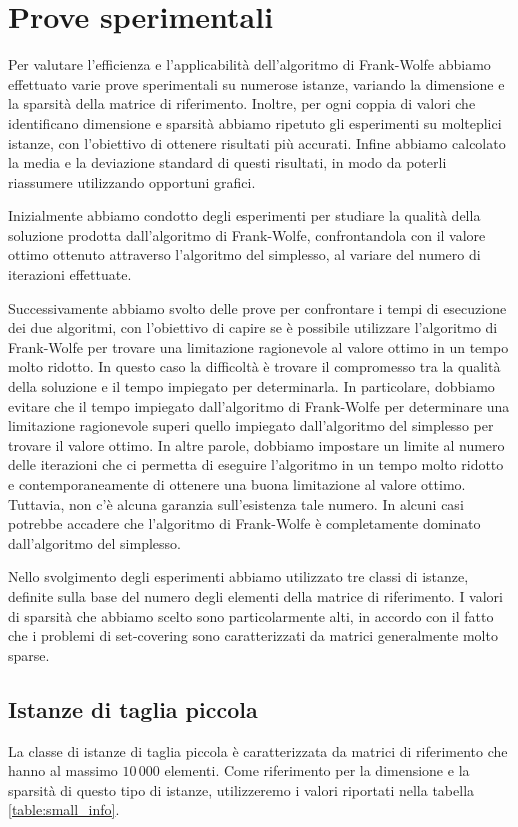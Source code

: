\section{Prove sperimentali}
Per valutare l'efficienza e l'applicabilità dell'algoritmo di Frank-Wolfe abbiamo effettuato varie prove sperimentali su
numerose istanze, variando la dimensione e la sparsità della matrice di riferimento. Inoltre, per ogni coppia di valori
che identificano dimensione e sparsità abbiamo ripetuto gli esperimenti su molteplici istanze, con l'obiettivo di
ottenere risultati più accurati. Infine abbiamo calcolato la media e la deviazione standard di questi risultati, in modo
da poterli riassumere utilizzando opportuni grafici.

Inizialmente abbiamo condotto degli esperimenti per studiare la qualità della soluzione prodotta dall'algoritmo di
Frank-Wolfe, confrontandola con il valore ottimo ottenuto attraverso l'algoritmo del simplesso, al variare del numero di
iterazioni effettuate.

Successivamente abbiamo svolto delle prove per confrontare i tempi di esecuzione dei due algoritmi, con l'obiettivo di
capire se è possibile utilizzare l'algoritmo di Frank-Wolfe per trovare una limitazione ragionevole al valore ottimo in
un tempo molto ridotto. In questo caso la difficoltà è trovare il compromesso tra la qualità della soluzione e il tempo
impiegato per determinarla. In particolare, dobbiamo evitare che il tempo impiegato dall'algoritmo di Frank-Wolfe per
determinare una limitazione ragionevole superi quello impiegato dall'algoritmo del simplesso per trovare il valore
ottimo. In altre parole, dobbiamo impostare un limite al numero delle iterazioni che ci permetta di eseguire l'algoritmo
in un tempo molto ridotto e contemporaneamente di ottenere una buona limitazione al valore ottimo. Tuttavia, non c'è
alcuna garanzia sull'esistenza tale numero. In alcuni casi potrebbe accadere che l'algoritmo di Frank-Wolfe è
completamente dominato dall'algoritmo del simplesso.

Nello svolgimento degli esperimenti abbiamo utilizzato tre classi di istanze, definite sulla base del numero degli
elementi della matrice di riferimento. I valori di sparsità che abbiamo scelto sono particolarmente alti, in accordo con
il fatto che i problemi di set-covering sono caratterizzati da matrici generalmente molto sparse.

\subsection{Istanze di taglia piccola}
La classe di istanze di taglia piccola è caratterizzata da matrici di riferimento che hanno al massimo $10\,000$
elementi.
Come riferimento per la dimensione e la sparsità di questo tipo di istanze, utilizzeremo i valori riportati
nella tabella \ref{table:small_info}.

